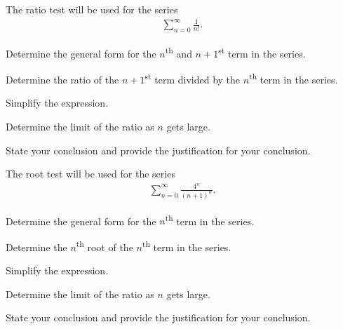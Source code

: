 \begin{problem}

  \item The ratio test will be used for the series
  \begin{eqnarray*}
    \sum^\infty_{n=0} \frac{1}{n!}.
  \end{eqnarray*}
  \begin{subproblem}
    \item Determine the general form for the $n$\textsuperscript{th} and $n+1$\textsuperscript{st} term in the series.
      \vfill
    \item Determine the ratio of the $n+1$\textsuperscript{st} term
      divided by the $n$\textsuperscript{th} term in the series.
      \vfill
    \item Simplify the expression.
      \vfill
    \item Determine the limit of the ratio as $n$ gets large.
      \vfill
    \item State your conclusion and provide the justification for your conclusion.
      \vfill
  \end{subproblem}

  \clearpage

  \item The root test will be used for the series
  \begin{eqnarray*}
    \sum^\infty_{n=0} \frac{4^n}{(n+1)^n}.
  \end{eqnarray*}
  \begin{subproblem}
    \item Determine the general form for the $n$\textsuperscript{th} term in the series.
      \vfill
    \item Determine the $n$\textsuperscript{th} root of the $n$\textsuperscript{th}  term in the series.
      \vfill
    \item Simplify the expression.
      \vfill
    \item Determine the limit of the ratio as $n$ gets large.
      \vfill
    \item State your conclusion and provide the justification for your conclusion.
      \vfill
  \end{subproblem}

\clearpage


\end{problem}
